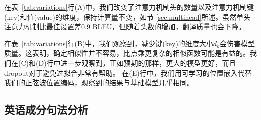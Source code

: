 
在表~\ref{tab:variations}行(A)中，我们改变了注意力机制头的数量以及注意力机制键(key)和值(value)的维度，保持计算量不变，如节 \ref{sec:multihead}所述。虽然单头注意力机制比最佳设置差0.9 BLEU，但随着头数的增加，翻译质量也会下降。


在表~\ref{tab:variations}行(B)中，我们观察到，减少键(key)的维度大小$d_k$会伤害模型质量。这表明，确定相似性并不容易，比点乘更复杂的相似函数可能是有益的。我们在(C)和(D)行中进一步观察到，正如预期的那样，更大的模型更好，而且dropout对于避免过拟合非常有帮助。 在(E)行中，我们用可学习的位置嵌入代替我们的正弦波位置编码\citep{JonasFaceNet2017}，观察到的结果与基础模型几乎相同。




\subsection{英语成分句法分析}

